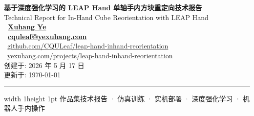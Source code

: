 \thispagestyle{empty} %

\vspace*{2.4cm}
\begin{center}
    {\Huge\bfseries\color{black} 基于深度强化学习的 LEAP Hand 单轴手内方块重定向技术报告} \\ [2em]
    {\Large\color{ReportBlue} Technical Report for In-Hand Cube Reorientation with LEAP Hand} \\ [4em]

    {\Large\bfseries\color{ReportGreen}
        \faUser\ \href{https://yexuhang.com/}{Xuhang Ye} \\ [0.5em]
        \faEnvelope\ \href{mailto:cquleaf@yexuhang.com}{cquleaf@yexuhang.com}
    } \\[3em]

	    {\normalsize
	        \faGithub\ \href{https://github.com/CQULeaf/leap-hand-inhand-reorientation}{github.com/CQULeaf/leap-hand-inhand-reorientation} \\ [0.5em]
	        \faGlobe\ \href{https://yexuhang.com/projects/leap-hand-inhand-reorientation}{yexuhang.com/projects/leap-hand-inhand-reorientation}
	    } \\[3em]

    {\normalsize\color{ReportOrange}
        创建于: 2026 年 5 月 17 日 \\ [0.5em]
        更新于: \today
    }
\end{center}

\vfill
\begin{center}
    \hrule width 1\textwidth height 1pt
    \vspace{0.5em}
    \small\color{gray} 作品集技术报告 · 仿真训练 · 实机部署 · 深度强化学习 · 机器人手内操作
\end{center}

\newpage

\tableofcontents
\newpage

